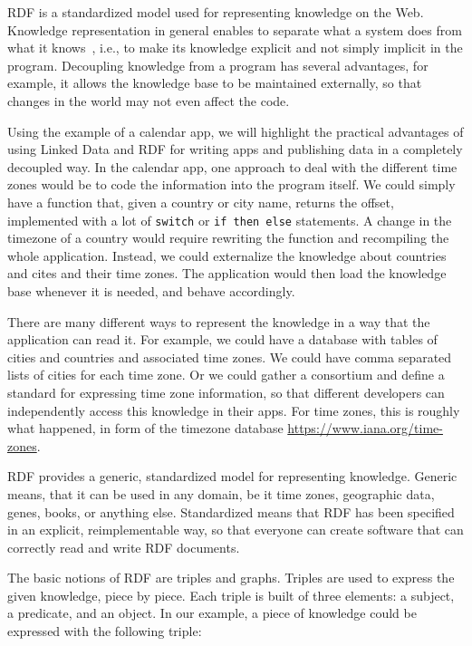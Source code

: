 RDF is a standardized model used for representing knowledge on the Web.
Knowledge representation in general enables to separate what a system does from what it knows~\cite{brachmannKR}, i.e., to make its knowledge explicit and not simply implicit in the program.
Decoupling knowledge from a program has several advantages, for example, it allows the knowledge base to be maintained externally, so that changes in the world may not even affect the code.

Using the example of a calendar app, we will highlight the practical advantages of using Linked Data and RDF for writing apps and publishing data in a completely decoupled way.
In the calendar app, one approach to deal with the different time zones would be to code the information into the program itself. 
We could simply have a function that, given a country or city name, returns the offset, implemented with a lot of \texttt{switch} or \texttt{if then else} statements.
A change in the timezone of a country would require rewriting the function and recompiling the whole application.
Instead, we could externalize the knowledge about countries and cites and their time zones.
The application would then load the knowledge base whenever it is needed, and behave accordingly.

There are many different ways to represent the knowledge in a way that the application can read it.
For example, we could have a database with tables of cities and countries and associated time zones.
We could have comma separated lists of cities for each time zone.
Or we could gather a consortium and define a standard for expressing time zone information, so that different developers can independently access this knowledge in their apps.%
For time zones, this is roughly what happened, in form of the timezone database \url{https://www.iana.org/time-zones}.

RDF provides a generic, standardized model for representing knowledge.
Generic means, that it can be used in any domain, be it time zones, geographic data, genes, books, or anything else.
Standardized means that RDF has been specified in an explicit, reimplementable way, so that everyone can create software that can correctly read and write RDF documents.

The basic notions of RDF are triples and graphs.
Triples are used to express the given knowledge, piece by piece.
Each triple is built of three elements: a subject, a predicate, and an object.
In our example, a piece of knowledge could be expressed with the following triple:

